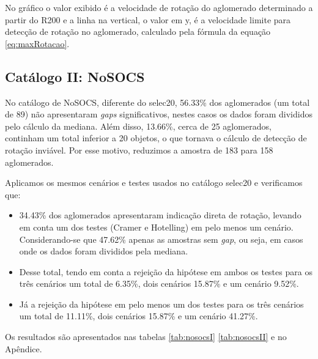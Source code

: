 No gráfico o valor exibido é a velocidade de rotação do aglomerado determinado a partir do R200 e a linha na vertical, o valor em y, é a velocidade limite para detecção de rotação no aglomerado, calculado pela fórmula da equação \ref{eq:maxRotacao}. 

\subsection{Catálogo II: NoSOCS}

No catálogo de NoSOCS, diferente do selec20, 56.33\% dos aglomerados (um total de 89) não apresentaram \textit{gaps} significativos, nestes casos os dados foram divididos pelo cálculo da mediana. Além disso, 13.66\%, cerca de 25 aglomerados, continham um total inferior a 20 objetos, o que tornava o cálculo de detecção de rotação inviável. Por esse motivo, reduzimos a amostra de 183 para 158 aglomerados.

Aplicamos os mesmos cenários e testes usados no catálogo selec20 e verificamos que:

\begin{itemize}
   	\item 34.43\% dos aglomerados apresentaram indicação direta de rotação, levando em conta um dos testes (Cramer e Hotelling) em pelo menos um cenário. Considerando-se que 47.62\% apenas as amostras sem \textit{gap}, ou seja, em casos onde os dados foram divididos pela mediana. 
   	\item Desse total, tendo em conta a rejeição da hipótese em ambos os testes para os três cenários um total de 6.35\%, dois cenários 15.87\% e um cenário 9.52\%.
   	\item Já a rejeição da hipótese em pelo menos um dos testes para os três cenários um total de 11.11\%, dois cenários 15.87\% e um cenário 41.27\%. 
 \end{itemize} 

 Os resultados são apresentados nas tabelas \ref{tab:nosocsI} \ref{tab:nosocsII} e no Apêndice.

